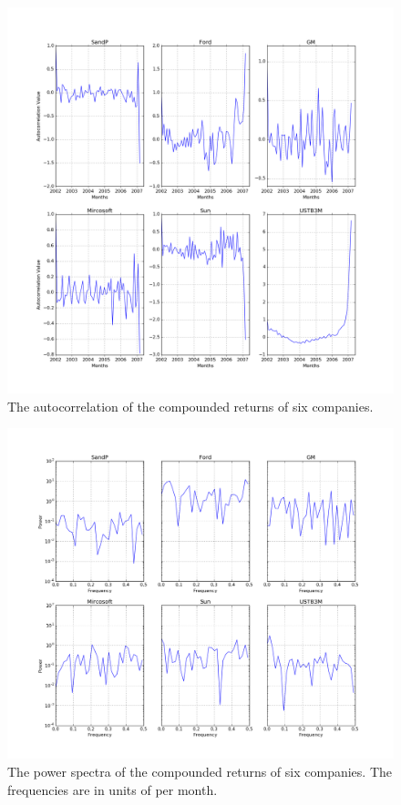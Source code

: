 \documentclass[twocolumn]{article}
\begin{document}
\begin{figure}
  \includegraphics[width=\linewidth]{stocks_ac.png}
  \caption{
    The autocorrelation of the compounded returns of six companies.
  }
  \label{fig:stocks_ac}
\end{figure}

\begin{figure}
  \includegraphics[width=\linewidth]{stocks_power_spectrum.png}
  \caption{
    The power spectra of the compounded returns of six companies. The
    frequencies are in units of per month.
  }
  \label{fig:stocks_ps}
\end{figure}
\end{document}
